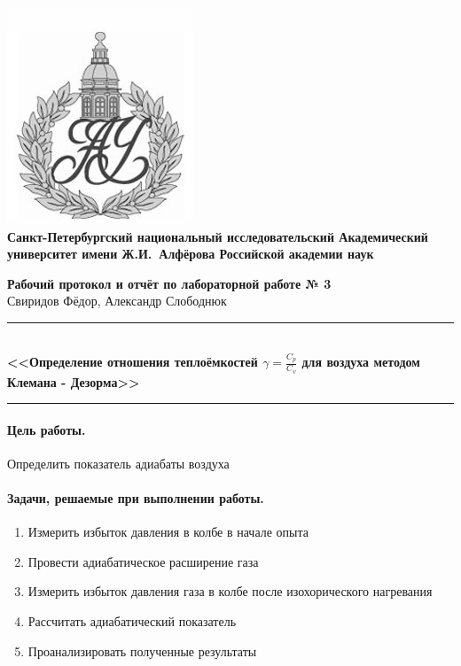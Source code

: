 \documentclass{article}
\begin{document}
\begin{center}
	\includegraphics[scale=0.25]{AU}\\
	{\Large\bfseries Санкт-Петербургский национальный исследовательский Академический университет имени Ж.И.~Алфёрова Российской академии наук}
\end{center}

\begin{center}
	{\large\textbf{Рабочий протокол и отчёт по лабораторной работе № 3}}\\
	Свиридов Фёдор, Александр Слободнюк
\end{center}

\begin{center}
	\rule{12cm}{0.4mm}\\
	\large\bfseries{<<Определение отношения теплоёмкостей $\gamma=\frac{C_p}{C_v}$ для воздуха методом Клемана - Дезорма>>}\\
	\rule{12cm}{0.4mm}
\end{center}
	\paragraph{Цель работы.} Определить показатель адиабаты воздуха
\paragraph{Задачи, решаемые при выполнении работы.}
\begin{enumerate}
	\item Измерить избыток давления в колбе в начале опыта
	\item Провести адиабатическое расширение газа
	\item Измерить избыток давления газа в колбе после изохорического нагревания
	\item Рассчитать адиабатический показатель 
	\item Проанализировать полученные результаты
\end{enumerate}
\end{document}
